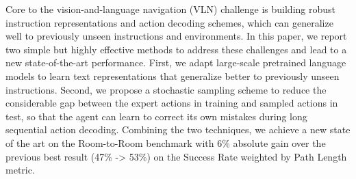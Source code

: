 Core to the vision-and-language navigation (VLN) challenge is building robust instruction representations and action decoding schemes, which can generalize well to previously unseen instructions and environments. In this paper, we report two simple but highly effective methods to address these challenges and lead to a new state-of-the-art performance. First, we adapt large-scale pretrained language models to learn text representations that generalize better to previously unseen instructions. Second, we propose a stochastic sampling scheme to reduce the considerable gap between the expert actions in training and sampled actions in test, so that the agent can learn to correct its own mistakes during long sequential action decoding. Combining the two techniques, we achieve a new state of the art on the Room-to-Room benchmark with 6\% absolute gain over the previous best result (47\% -> 53\%) on the Success Rate weighted by Path Length metric.